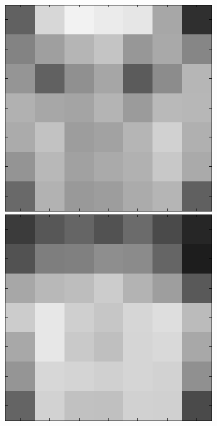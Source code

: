 \begin{figure}[ht]
 \includegraphics[width=\textwidth*11/100]{ch5/figures/XM2VTS_6_2.png}
 \includegraphics[width=\textwidth*11/100]{ch5/figures/XM2VTS_7_2.png}

\end{figure}
